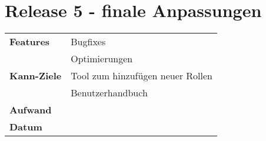 \section*{Release 5 - finale Anpassungen}
\label{sec:release_5}

\begin{tabular}{p{5cm} p{9cm}}
    \textbf{Features} &  Bugfixes \\
    & Optimierungen \\
    \hline
    \textbf{Kann-Ziele} & Tool zum hinzufügen neuer Rollen \\
    & Benutzerhandbuch \\
    \hline
    \textbf{Aufwand} & \\
    \hline
    \textbf{Datum} & 
\end{tabular}